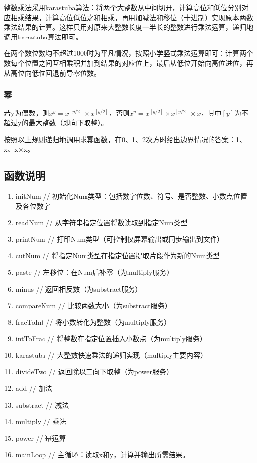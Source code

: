 \documentclass{homework}
\begin{document}
整数乘法采用karastuba算法：将两个大整数从中间切开，计算高位和低位分别对应相乘结果，计算高位低位之和相乘，再用加减法和移位（十进制）实现原本两数乘法结果的计算。这样只用对原来大整数长度一半长的整数进行乘法运算，递归地调用karastuba算法即可。

在两个数位数均不超过1000时为平凡情况，按照小学竖式乘法运算即可：计算两个数每个位置之间互相乘积并加到结果的对应位上，最后从低位开始向高位进位，再从高位向低位回退前导零位数。
\subsubsection{幂}
若y为偶数，则$x^y=x^{[y/2]}\times x^{[y/2]}$，否则$x^y=x^{[y/2]}\times x^{[y/2]}\times x$，其中$[y]$为不超过y的最大整数（即向下取整）。

按照以上规则递归地调用求幂函数，在0、1、2次方时给出边界情况的答案：1、x、x$\times$x。
\subsection{函数说明}
\begin{enumerate}
    \item initNum // 初始化Num类型：包括数字位数、符号、是否整数、小数点位置及各位数字
    \item readNum // 从字符串指定位置将数读取到指定Num类型
    \item printNum // 打印Num类型（可控制仅屏幕输出或同步输出到文件）
    \item cutNum // 将指定Num类型在指定位置提取片段作为新的Num类型
    \item paste // 左移位：在Num后补零（为multiply服务）
    \item minus // 返回相反数（为substract服务）
    \item compareNum // 比较两数大小（为substract服务）
    \item fracToInt // 将小数转化为整数（为multiply服务）
    \item intToFrac // 将整数在指定位置插入小数点（为multiply服务）
    \item karastuba // 大整数快速乘法的递归实现（multiply主要内容）
    \item divideTwo // 返回除以二向下取整（为power服务）
    \item add // 加法
    \item substract // 减法
    \item multiply // 乘法
    \item power // 幂运算
    \item mainLoop // 主循环：读取x和y，计算并输出所需结果。
\end{enumerate}
\end{document}
